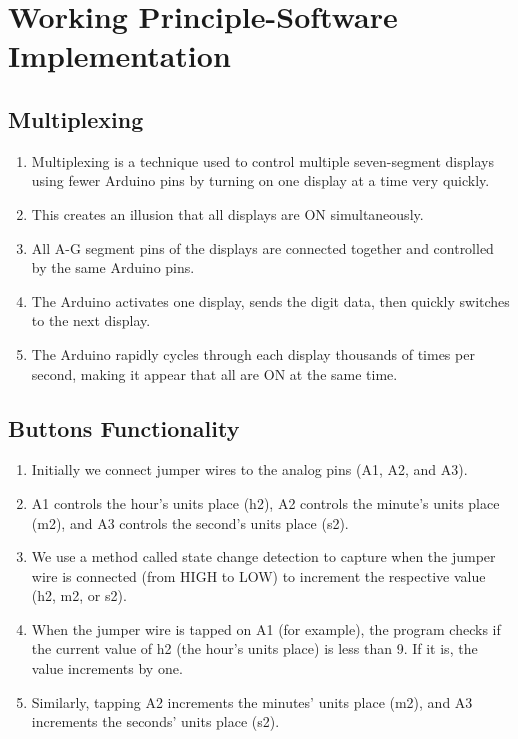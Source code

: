 \documentclass[journal]{IEEEtran}
\begin{document}
\section{Working Principle-Software Implementation}

\subsection{Multiplexing}
\begin{enumerate}
    \item Multiplexing is a technique used to control multiple seven-segment displays using fewer Arduino pins by turning on one display at a time very quickly.
    \item This creates an illusion that all displays are ON simultaneously.
    \item All A-G segment pins of the displays are connected together and controlled by the same Arduino pins.
    \item The Arduino activates one display, sends the digit data, then quickly switches to the next display.
    \item The Arduino rapidly cycles through each display thousands of times per second, making it appear that all are ON at the same time.
\end{enumerate}

\subsection{Buttons Functionality}
\begin{enumerate}
    \item Initially we connect jumper wires to the analog pins (A1, A2, and A3).
    \item A1 controls the hour's units place (h2), A2 controls the minute's units place (m2), and A3 controls the second's units place (s2).
    \item We use a method called state change detection to capture when the jumper wire is connected (from HIGH to LOW) to increment the respective value (h2, m2, or s2).
    \item When the jumper wire is tapped on A1 (for example), the program checks if the current value of h2 (the hour's units place) is less than 9. If it is, the value increments by one.
    \item Similarly, tapping A2 increments the minutes' units place (m2), and A3 increments the seconds' units place (s2).
\end{enumerate}
\end{document}
